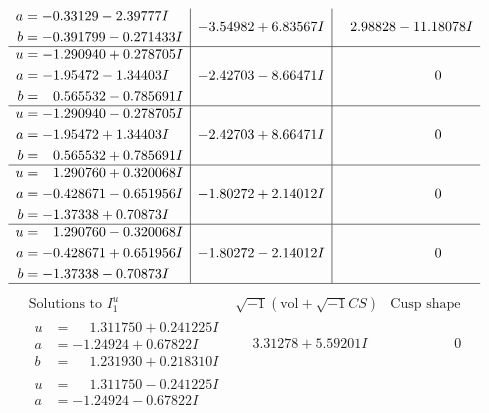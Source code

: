 \documentclass[1p]{elsarticle_modified}
\theoremstyle{definition}
\newcommand{\I}{\sqrt{-1}}
\begin{document}
$$\begin{array}{c|c|c}
\begin{aligned}
a &= -0.33129 - 2.39777 I \\
b &= -0.391799 - 0.271433 I\end{aligned}
 & -3.54982 + 6.83567 I & \phantom{-}2.98828 - 11.18078 I \\ \hline\begin{aligned}
u &= -1.290940 + 0.278705 I \\
a &= -1.95472 - 1.34403 I \\
b &= \phantom{-}0.565532 - 0.785691 I\end{aligned}
 & -2.42703 - 8.66471 I & \phantom{-0.000000 } 0 \\ \hline\begin{aligned}
u &= -1.290940 - 0.278705 I \\
a &= -1.95472 + 1.34403 I \\
b &= \phantom{-}0.565532 + 0.785691 I\end{aligned}
 & -2.42703 + 8.66471 I & \phantom{-0.000000 } 0 \\ \hline\begin{aligned}
u &= \phantom{-}1.290760 + 0.320068 I \\
a &= -0.428671 - 0.651956 I \\
b &= -1.37338 + 0.70873 I\end{aligned}
 & -1.80272 + 2.14012 I & \phantom{-0.000000 } 0 \\ \hline\begin{aligned}
u &= \phantom{-}1.290760 - 0.320068 I \\
a &= -0.428671 + 0.651956 I \\
b &= -1.37338 - 0.70873 I\end{aligned}
 & -1.80272 - 2.14012 I & \phantom{-0.000000 } 0\\
 \hline 
 \end{array}$$\newpage$$\begin{array}{c|c|c}  
\text{Solutions to }I^u_{1}& \I (\text{vol} + \sqrt{-1}CS) & \text{Cusp shape}\\
 \hline 
\begin{aligned}
u &= \phantom{-}1.311750 + 0.241225 I \\
a &= -1.24924 + 0.67822 I \\
b &= \phantom{-}1.231930 + 0.218310 I\end{aligned}
 & \phantom{-}3.31278 + 5.59201 I & \phantom{-0.000000 } 0 \\ \hline\begin{aligned}
u &= \phantom{-}1.311750 - 0.241225 I \\
a &= -1.24924 - 0.67822 I \\

\end{aligned}
\end{array}$$
\end{document}

